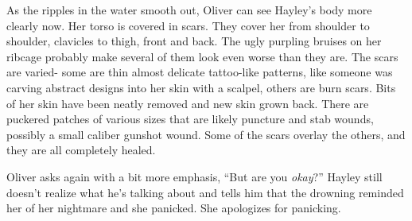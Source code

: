 As the ripples in the water smooth out, Oliver can see Hayley's body more clearly now.  Her torso is covered in scars.  They cover her from shoulder to shoulder, clavicles to thigh, front and back.  The ugly purpling bruises on her ribcage probably make several of them look even worse than they are.  The scars are varied- some are thin almost delicate tattoo-like patterns, like someone was carving abstract designs into her skin with a scalpel, others are burn scars.  Bits of her skin have been neatly removed and new skin grown back.  There are puckered patches of various sizes that are likely puncture and stab wounds, possibly a small caliber gunshot wound.  Some of the scars overlay the others, and they are all completely healed.



Oliver asks again with a bit more emphasis, ``But are you \textit{okay}?'' Hayley still doesn't realize what he's talking about and tells him that the drowning reminded her of her nightmare and she panicked.  She apologizes for panicking.



